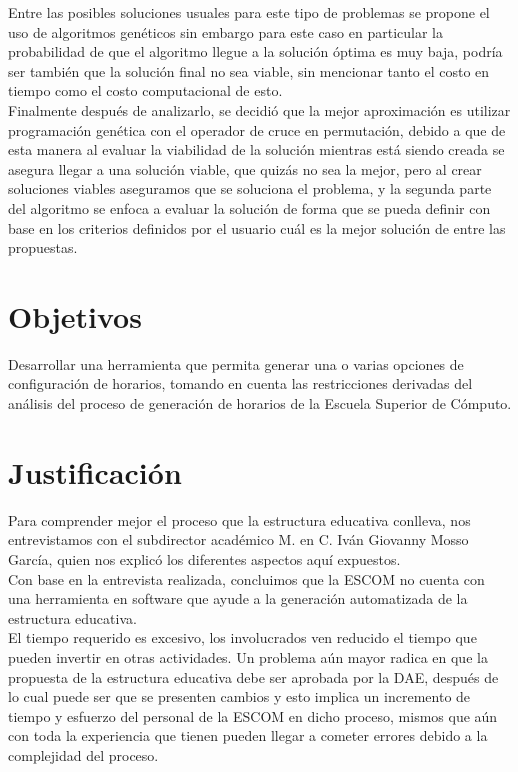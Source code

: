 	Entre las posibles soluciones usuales para este tipo de problemas se propone el uso de algoritmos genéticos sin embargo para este caso en particular la probabilidad de que el algoritmo llegue a la solución óptima es muy baja, podría ser también que la solución final no sea viable, sin mencionar tanto el costo en tiempo como el costo computacional de esto.\\
	
	Finalmente después de analizarlo, se decidió que la mejor aproximación es utilizar programación genética con el operador de cruce en permutación, debido a que de esta manera al evaluar la viabilidad de la solución mientras está siendo creada se asegura llegar a una solución viable, que quizás no sea la mejor, pero al crear soluciones viables aseguramos que se soluciona el problema, y la segunda parte del algoritmo se enfoca a evaluar la solución de forma que se pueda definir con base en los criterios definidos por el usuario cuál es la mejor solución de entre las propuestas.\\

\section{Objetivos}
	Desarrollar una herramienta que permita generar una o varias opciones de configuración de horarios, tomando en cuenta las restricciones derivadas del análisis del proceso de generación de horarios de la Escuela Superior de Cómputo.

\section{Justificación}
	Para comprender mejor el proceso que la estructura educativa conlleva, nos entrevistamos con el subdirector académico M. en C. Iván Giovanny Mosso García, quien nos explicó los diferentes aspectos aquí expuestos. \\
	
	Con base en la entrevista realizada, concluimos que la ESCOM no cuenta con una herramienta en software que ayude a la generación automatizada de la estructura educativa.  \\
	
	El tiempo requerido es excesivo, los involucrados ven reducido el tiempo que pueden invertir en otras actividades. Un problema aún mayor radica en que la propuesta de la estructura educativa debe ser aprobada por la DAE, después de lo cual puede ser
	que se presenten cambios y esto implica un incremento de tiempo y esfuerzo del personal de la ESCOM en dicho proceso, mismos que aún con toda la experiencia que tienen pueden llegar a cometer errores debido a la complejidad del proceso.  \\
	
